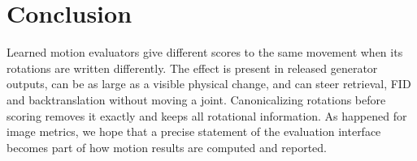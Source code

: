 \documentclass[10pt,twocolumn,letterpaper]{article}
\begin{document}
\section{Conclusion}
Learned motion evaluators give different scores to the same movement when its rotations are written differently. The effect is present in released generator outputs, can be as large as a visible physical change, and can steer retrieval, FID and backtranslation without moving a joint. Canonicalizing rotations before scoring removes it exactly and keeps all rotational information. As happened for image metrics, we hope that a precise statement of the evaluation interface becomes part of how motion results are computed and reported.

{\small}
\end{document}
